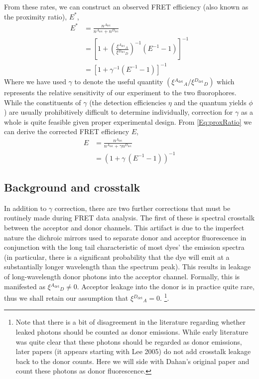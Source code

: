 \documentclass{article}
\newcommand{\dt}[1]{\ensuremath{^{#1_\mathrm{det}}}}   %
\begin{document}
From these rates, we can construct an observed FRET efficiency (also
known as the proximity ratio), $E^*$,
\begin{align*}
  E^* & = \frac{n\dt{A}}{n\dt{A} + n\dt{D}} \\
      & = \left[ 1 + \left(\frac{\xi\dt{A}_A}{\xi\dt{D}_D}\right)^{-1} (E^{-1} - 1) \right]^{-1} \\
      & = \left[ 1 + \gamma^{-1} (E^{-1} - 1) \right]^{-1} \label{Eq:proxRatio}
\end{align*}
Where we have used $\gamma$ to denote the useful quantity $(\xi\dt{A}_A / \xi\dt{D}_D)$
which represents the relative sensitivity of our experiment to the two
fluorophores. While the constituents of $\gamma$ (the detection
efficiencies $\eta$ and the quantum yields $\phi$) are usually
prohibitively difficult to determine individually, correction for
$\gamma$ as a whole is quite feasible given proper experimental
design. From \eqref{Eq:proxRatio} we can derive the corrected FRET
efficiency $E$,
\begin{align}
  E & = \frac{n\dt{A}}{n\dt{A} + \gamma n\dt{D}} \\
  & = \left( 1 + \gamma ~ (E^{-1} - 1) \right)^{-1} \label{Eq:gammaFretEff}
\end{align}

\subsection{Background and crosstalk}
In addition to $\gamma$ correction, there are two further corrections that
must be routinely made during FRET data analysis. The first of these
is spectral crosstalk between the acceptor and donor channels. This
artifact is due to the imperfect nature the dichroic mirrors
used to separate donor and acceptor fluorescence in conjunction with
the long tail characteristic of most dyes' the emission spectra (in
particular, there is a significant probability that the dye will emit
at a substantially longer wavelength than the spectrum peak).  This
results in leakage of long-wavelength donor photons into the acceptor
channel. Formally, this is manifested as $\xi\dt{A}_D \ne 0$. Acceptor
leakage into the donor is in practice quite rare, thus we shall retain
our assumption that $\xi\dt{D}_A=0$.
\footnote{Note that there is a bit of disagreement in the
literature regarding whether leaked photons should be counted as donor
emissions. While early literature\cite{Dahan2005,Taylor2010} was quite
clear that these photons should be regarded as donor emissions, later
papers (it appears starting with Lee 2005\cite{Lee2005}) do not add
crosstalk leakage back to the donor counts. Here we will side with
Dahan's original paper and count these photons as donor
fluorescence.}.
\end{document}
